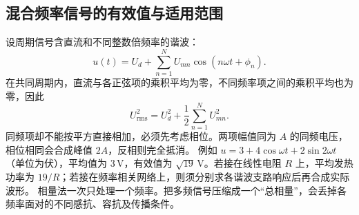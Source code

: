 \subsection{混合频率信号的有效值与适用范围}
设周期信号含直流和不同整数倍频率的谐波：
\[
 u(t)=U_d+\sum_{n=1}^{N}U_{mn}\cos(n\omega t+\phi_n).
\]
在共同周期内，直流与各正弦项的乘积平均为零，不同频率项之间的乘积平均也为零，因此
\[
 U_{\mathrm{rms}}^2=U_d^2+\frac12\sum_{n=1}^{N}U_{mn}^2.
\]
同频项却不能按平方直接相加，必须先考虑相位。两项幅值同为 $A$ 的同频电压，相位相同会合成峰值 $2A$，反相则完全抵消。
例如 $u=3+4\cos\omega t+2\sin2\omega t$（单位为伏），平均值为 $3\,\mathrm V$，有效值为 $\sqrt{19}\,\mathrm V$。若接在线性电阻 $R$ 上，平均发热功率为 $19/R$；若接在频率相关网络上，则须分别求各谐波支路响应后再合成实际波形。
相量法一次只处理一个频率。把多频信号压缩成一个“总相量”，会丢掉各频率面对的不同感抗、容抗及传播条件。

